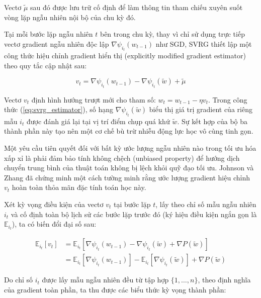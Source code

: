 Vectơ $\tilde{\mu}$ sau đó được lưu trữ cố định để làm thông tin tham chiếu xuyên suốt vòng lặp ngẫu nhiên nội bộ của chu kỳ đó. 


Tại mỗi bước lặp ngẫu nhiên $t$ bên trong chu kỳ, thay vì chỉ sử dụng trực tiếp vectơ gradient ngẫu nhiên độc lập $\nabla \psi_{i_t}(w_{t-1})$ như SGD, SVRG thiết lập một công thức hiệu chỉnh gradient hiển thị (explicitly modified gradient estimator) theo quy tắc cập nhật sau:

\begin{equation}\label{eq:svrg_estimator}
v_t = \nabla \psi_{i_t}(w_{t-1}) - \nabla \psi_{i_t}(\tilde{w}) + \tilde{\mu}
\end{equation}

Vectơ $v_t$ định hình hướng trượt mới cho tham số: $w_t = w_{t-1} - \eta v_t$. Trong công thức (\ref{eq:svrg_estimator}), số hạng $\nabla \psi_{i_t}(\tilde{w})$ biểu thị giá trị gradient của riêng mẫu $i_t$ được đánh giá lại tại vị trí điểm chụp quá khứ $\tilde{w}$. Sự kết hợp của bộ ba thành phần này tạo nên một cơ chế bù trừ nhiễu động lực học vô cùng tinh gọn.


Một yêu cầu tiên quyết đối với bất kỳ ước lượng ngẫu nhiên nào trong tối ưu hóa xấp xỉ là phải đảm bảo tính không chệch (unbiased property) để hướng dịch chuyển trung bình của thuật toán không bị lệch khỏi quỹ đạo tối ưu. Johnson và Zhang \cite{johnson2013accelerating} đã chứng minh một cách tường minh rằng ước lượng gradient hiệu chỉnh $v_t$ hoàn toàn thỏa mãn đặc tính toán học này.

Xét kỳ vọng điều kiện của vectơ $v_t$ tại bước lặp $t$, lấy theo chỉ số mẫu ngẫu nhiên $i_t$ và cố định toàn bộ lịch sử các bước lặp trước đó (ký hiệu điều kiện ngắn gọn là $\mathbb{E}_{i_t}$), ta có biến đổi đại số sau:

\begin{align}
\mathbb{E}_{i_t} \left[ v_t \right] &= \mathbb{E}_{i_t} \left[ \nabla \psi_{i_t}(w_{t-1}) - \nabla \psi_{i_t}(\tilde{w}) + \nabla P(\tilde{w}) \right] \\
&= \mathbb{E}_{i_t} \left[ \nabla \psi_{i_t}(w_{t-1}) \right] - \mathbb{E}_{i_t} \left[ \nabla \psi_{i_t}(\tilde{w}) \right] + \nabla P(\tilde{w})
\end{align}

Do chỉ số $i_t$ được lấy mẫu ngẫu nhiên đều từ tập hợp $\{1, \dots, n\}$, theo định nghĩa của gradient toàn phần, ta thu được các biểu thức kỳ vọng thành phần:


